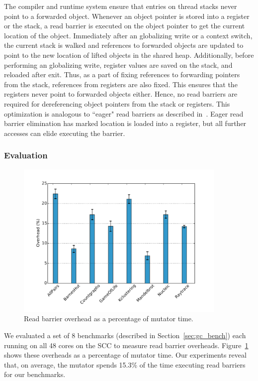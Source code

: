 The compiler and runtime system ensure that entries on thread stacks never
point to a forwarded object. Whenever an object pointer is stored into a
register or the stack, a read barrier is executed on the object pointer to get
the current location of the object. Immediately after an globalizing write or a
context switch, the current stack is walked and references to forwarded objects
are updated to point to the new location of lifted objects in the shared heap.
Additionally, before performing an globalizing write, register values are saved
on the stack, and reloaded after exit. Thus, as a part of fixing references to
forwarding pointers from the stack, references from registers are also fixed.
This ensures that the registers never point to forwarded objects either. Hence,
no read barriers are required for dereferencing object pointers from the stack
or registers. This optimization is analogous to ``eager" read barriers as
described in~\cite{Bacon03}. Eager read barrier elimination has marked
location is loaded into a register, but all further accesses can elide
executing the barrier.

\subsubsection{Evaluation}

\begin{figure}
  \centering
  \includegraphics[width=0.9\textwidth]{Graphs/RB_overhead}
	\caption{Read barrier overhead as a percentage of mutator time.}
  \label{fig:rb-overhead}
\end{figure}

We evaluated a set of 8 benchmarks (described in Section~\ref{sec:gc_bench})
each running on all 48 cores on the SCC to measure read barrier overheads.
Figure~\ref{fig:rb-overhead} shows these overheads as a percentage of mutator
time. Our experiments reveal that, on average, the mutator spends 15.3\% of the
time executing read barriers for our benchmarks.


